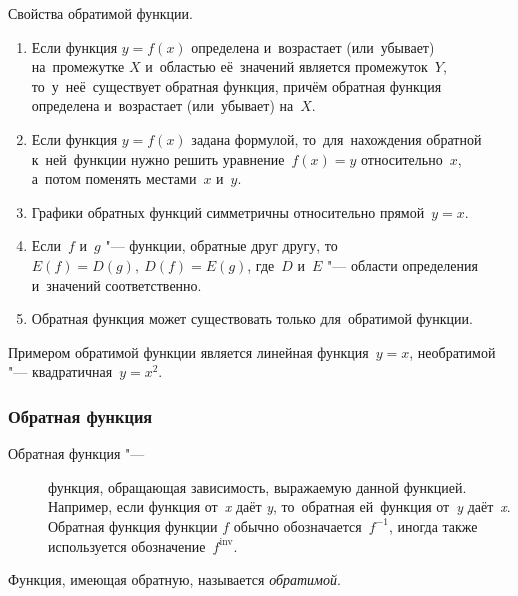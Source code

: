 \documentclass[]{scrartcl}
\begin{document}
{{Свойства обратимой функции.
\begin{enumerate}
	\item Если функция ${\displaystyle y=f(x)}$ определена и~возрастает (или~убывает) на~промежутке ${\displaystyle X}$ и~областью её~значений является промежуток~${\displaystyle Y}$, то~у~неё~существует обратная функция, причём обратная функция определена и~возрастает (или~убывает) на~${\displaystyle X}$.
	\item Если функция ${\displaystyle y=f(x)}$ задана формулой, то~для~нахождения обратной к~ней~функции нужно решить уравнение~${\displaystyle f(x)=y}$ относительно~${\displaystyle x}$, а~потом поменять местами~${\displaystyle x}$ и~${\displaystyle y}$.
	\item Графики обратных функций симметричны относительно прямой~${\displaystyle y=x}$.
	\item Если~${\displaystyle f}$ и~${\displaystyle g}$ "--- функции, обратные друг другу, то~${\displaystyle E(f)=D(g),\ D(f)=E(g)}$, где~${\displaystyle D}$ и~${\displaystyle E}$ "--- области определения и~значений соответственно.
	\item Обратная функция может существовать только для~обратимой функции.
\end{enumerate}
Примером обратимой функции является линейная функция~${\displaystyle y=x}$, необратимой "--- квадратичная~${\displaystyle y=x^{2}}$.  
%
\subsubsection{Обратная функция}
\begin{description}
	\item[Обратная функция "---] функция, обращающая зависимость, выражаемую данной функцией. Например, если функция от~\textit{x} даёт \textit{y}, то~обратная ей~функция от~\textit{y} даёт~\textit{x}. Обратная функция функции ${\displaystyle f}$ обычно обозначается~${\displaystyle f^{-1}}$, иногда также используется обозначение~${\displaystyle f^{\mathrm {inv} }}$.
\end{description}
Функция, имеющая обратную, называется \emph{обратимой}. 

}}
\end{document}
